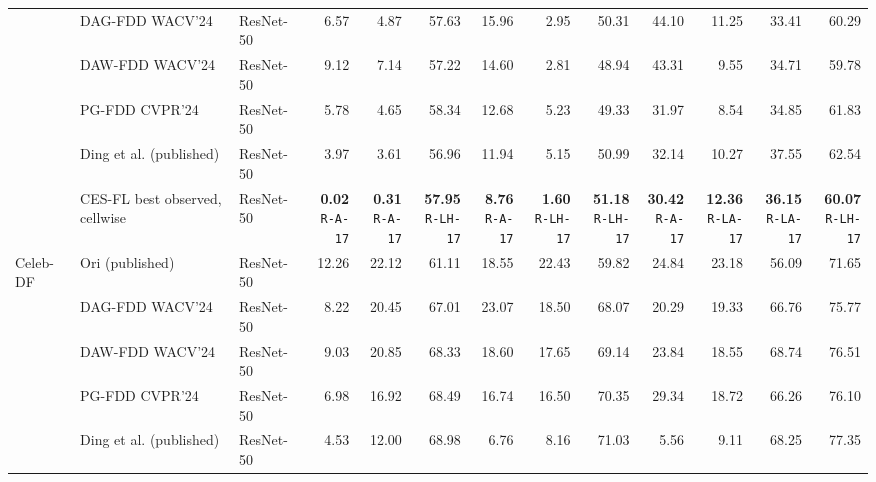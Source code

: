 \documentclass[10pt]{article}
\begin{document}
{\begin{tabular*}{\linewidth}{@{\extracolsep{\fill}}lllrrrrrrrrrr}
 & DAG-FDD WACV'24 & ResNet-50 & 6.57 & 4.87 & 57.63 & 15.96 & 2.95 & 50.31 & 44.10 & 11.25 & 33.41 & 60.29\\
 & DAW-FDD WACV'24 & ResNet-50 & 9.12 & 7.14 & 57.22 & 14.60 & 2.81 & 48.94 & 43.31 & 9.55 & 34.71 & 59.78\\
 & PG-FDD CVPR'24 & ResNet-50 & 5.78 & 4.65 & 58.34 & 12.68 & 5.23 & 49.33 & 31.97 & 8.54 & 34.85 & 61.83\\
 & Ding et al. (published) & ResNet-50 & 3.97 & 3.61 & 56.96 & 11.94 & 5.15 & 50.99 & 32.14 & 10.27 & 37.55 & 62.54\\
\rowcolor{blue!8} & CES-FL best observed, cellwise & ResNet-50 & \shortstack{\textbf{0.02}\\{\tiny\texttt{R-A-17}}} & \shortstack{\textbf{0.31}\\{\tiny\texttt{R-A-17}}} & \shortstack{\textbf{57.95}\\{\tiny\texttt{R-LH-17}}} & \shortstack{\textbf{8.76}\\{\tiny\texttt{R-A-17}}} & \shortstack{\textbf{1.60}\\{\tiny\texttt{R-LH-17}}} & \shortstack{\textbf{51.18}\\{\tiny\texttt{R-LH-17}}} & \shortstack{\textbf{30.42}\\{\tiny\texttt{R-A-17}}} & \shortstack{\textbf{12.36}\\{\tiny\texttt{R-LA-17}}} & \shortstack{\textbf{36.15}\\{\tiny\texttt{R-LA-17}}} & \shortstack{\textbf{60.07}\\{\tiny\texttt{R-LH-17}}}\\
\midrule
Celeb-DF & Ori (published) & ResNet-50 & 12.26 & 22.12 & 61.11 & 18.55 & 22.43 & 59.82 & 24.84 & 23.18 & 56.09 & 71.65\\
 & DAG-FDD WACV'24 & ResNet-50 & 8.22 & 20.45 & 67.01 & 23.07 & 18.50 & 68.07 & 20.29 & 19.33 & 66.76 & 75.77\\
 & DAW-FDD WACV'24 & ResNet-50 & 9.03 & 20.85 & 68.33 & 18.60 & 17.65 & 69.14 & 23.84 & 18.55 & 68.74 & 76.51\\
 & PG-FDD CVPR'24 & ResNet-50 & 6.98 & 16.92 & 68.49 & 16.74 & 16.50 & 70.35 & 29.34 & 18.72 & 66.26 & 76.10\\
 & Ding et al. (published) & ResNet-50 & 4.53 & 12.00 & 68.98 & 6.76 & 8.16 & 71.03 & 5.56 & 9.11 & 68.25 & 77.35\\

\end{tabular*}}
\end{document}
